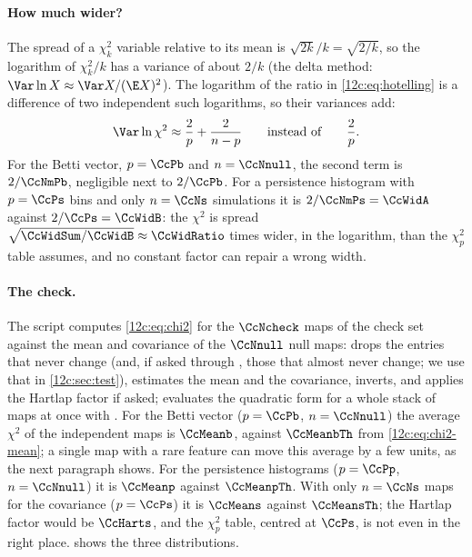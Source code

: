 \paragraph{How much wider?} The spread of a $\chi^2_k$ variable relative to its mean is $\sqrt{2k}/k=\sqrt{2/k}$, so the
logarithm of $\chi^2_k/k$ has a variance of about $2/k$ (the delta method: $\Var\ln X\approx\Var X/(\E X)^2$). The
logarithm of the ratio in \eqref{12c:eq:hotelling} is a difference of two independent such logarithms, so their variances
add:
\begin{equation}
  \Var\ln\chi^2\approx\frac2p+\frac2{n-p}\qquad\text{instead of}\qquad\frac2p .
  \label{12c:eq:width}
\end{equation}
For the Betti vector, $p=\CcPb$ and $n=\CcNnull$, the second term is $2/\CcNmPb$, negligible next to $2/\CcPb$. For a persistence
histogram with $p=\CcPs$ bins and only $n=\CcNs$ simulations it is $2/\CcNmPs=\CcWidA$ against $2/\CcPs=\CcWidB$: the $\chi^2$ is spread
$\sqrt{\CcWidSum/\CcWidB}\approx\CcWidRatio$ times wider, in the logarithm, than the $\chi^2_p$ table assumes, and no constant factor can
repair a wrong width.

\paragraph{The check.} The script  computes \eqref{12c:eq:chi2} for the $\CcNcheck$ maps of the
check set against the mean and covariance of the $\CcNnull$ null maps:
\noindent {} drops the entries that never change (and, if asked through , those that almost never
change; we use that in \cref{12c:sec:test}), estimates the mean and the covariance, inverts, and applies the Hartlap factor
if asked;  evaluates the quadratic form for a whole stack of maps at once with
. For the Betti vector ($p=\CcPb$, $n=\CcNnull$) the average $\chi^2$ of the independent maps is
$\CcMeanb$, against $\CcMeanbTh$ from \eqref{12c:eq:chi2-mean}; a single map with a rare feature can move this average by a
few units, as the next paragraph shows. For the persistence histograms ($p=\CcPp$, $n=\CcNnull$) it
is $\CcMeanp$ against $\CcMeanpTh$. With only $n=\CcNs$ maps for the covariance ($p=\CcPs$) it is $\CcMeans$ against
$\CcMeansTh$; the Hartlap factor would be $\CcHarts$, and the $\chi^2_p$ table, centred at $\CcPs$, is not even in the right
place.  shows the three distributions.


